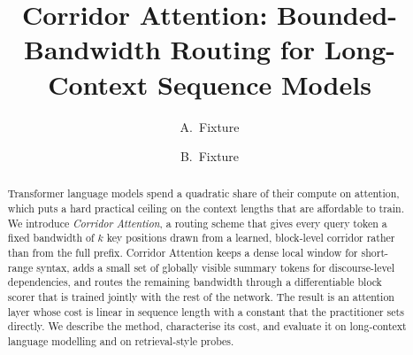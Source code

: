 \documentclass[11pt]{article}
\title{Corridor Attention: Bounded-Bandwidth Routing for Long-Context
Sequence Models}
\author{A.~Fixture \and B.~Fixture}
\date{}
\begin{document}
\maketitle

\begin{abstract}
Transformer language models spend a quadratic share of their compute on
attention, which puts a hard practical ceiling on the context lengths that are
affordable to train. We introduce \emph{Corridor Attention}, a routing scheme
that gives every query token a fixed bandwidth of $k$ key positions drawn from
a learned, block-level corridor rather than from the full prefix. Corridor
Attention keeps a dense local window for short-range syntax, adds a small set
of globally visible summary tokens for discourse-level dependencies, and routes
the remaining bandwidth through a differentiable block scorer that is trained
jointly with the rest of the network. The result is an attention layer whose
cost is linear in sequence length with a constant that the practitioner sets
directly. We describe the method, characterise its cost, and evaluate it on
long-context language modelling and on retrieval-style probes.
\end{abstract}










\end{document}
